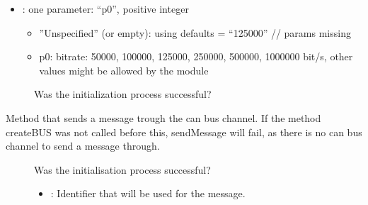 \documentclass[letterpaper,10pt,english]{sphinxmanual}
\begin{document}
\begin{fulllineitems}
\begin{fulllineitems}
\begin{description}
\begin{itemize}
\begin{itemize}
\end{itemize}


\item {} 
: one parameter: “p0”, positive integer\begin{itemize}
\item {} 
”Unspecified” (or empty): using defaults = “125000” // params missing

\item {} 
p0: bitrate: 50000, 100000, 125000, 250000, 500000, 1000000 bit/s, other values might be allowed by the module

\end{itemize}


\end{itemize}

\end{description}


\begin{description}
\item[{}] \leavevmode
Was the initialization process successful? 

\end{description}


\end{fulllineitems}


\begin{fulllineitems}
\label{\detokenize{vendors/systec:_CPPv4N12CSockCanScan11sendMessageEshPhb}}%
\pysigstartmultiline
{}\label{\detokenize{vendors/systec:classCSockCanScan_1a485ec8621a98cdacad8e27433e09d919}}%
\pysigstopmultiline
Method that sends a message trough the can bus channel. If the method createBUS was not called before this, sendMessage will fail, as there is no can bus channel to send a message through.

\begin{description}
\item[{}] \leavevmode
Was the initialisation process successful? 

\item[{}] \leavevmode\begin{itemize}
\item {} 
: Identifier that will be used for the message. 


\end{itemize}
\end{description}
\end{fulllineitems}
\end{fulllineitems}
\end{document}
